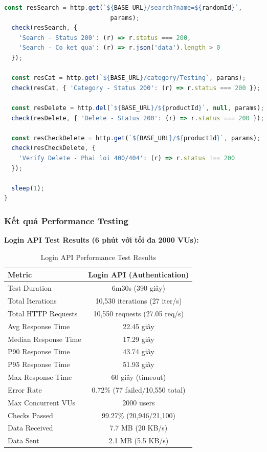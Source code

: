\begin{lstlisting}[language=JavaScript, caption=Performance.productAPI.js - CRUD Operations]
  const resSearch = http.get(`${BASE_URL}/search?name=${randomId}`, 
                             params);
  check(resSearch, { 
    'Search - Status 200': (r) => r.status === 200, 
    'Search - Co ket qua': (r) => r.json('data').length > 0 
  });

  const resCat = http.get(`${BASE_URL}/category/Testing`, params);
  check(resCat, { 'Category - Status 200': (r) => r.status === 200 });

  const resDelete = http.del(`${BASE_URL}/${productId}`, null, params);
  check(resDelete, { 'Delete - Status 200': (r) => r.status === 200 });

  const resCheckDelete = http.get(`${BASE_URL}/${productId}`, params);
  check(resCheckDelete, { 
    'Verify Delete - Phai loi 400/404': (r) => r.status !== 200 
  });

  sleep(1);
}
\end{lstlisting}

\subsubsection{Kết quả Performance Testing}

\textbf{Login API Test Results (6 phút với tối đa 2000 VUs):}
\begin{table}[H]
\centering
\begin{tabular}{|l|c|}
\hline
\textbf{Metric} & \textbf{Login API (Authentication)} \\
\hline
Test Duration & 6m30s (390 giây) \\
\hline
Total Iterations & 10,530 iterations (27 iter/s) \\
\hline
Total HTTP Requests & 10,550 requests (27.05 req/s) \\
\hline
Avg Response Time & 22.45 giây \\
\hline
Median Response Time & 17.29 giây \\
\hline
P90 Response Time & 43.74 giây \\
\hline
P95 Response Time & 51.93 giây \\
\hline
Max Response Time & 60 giây (timeout) \\
\hline
Error Rate & 0.72\% (77 failed/10,550 total) \\
\hline
Max Concurrent VUs & 2000 users \\
\hline
Checks Passed & 99.27\% (20,946/21,100) \\
\hline
Data Received & 7.7 MB (20 KB/s) \\
\hline
Data Sent & 2.1 MB (5.5 KB/s) \\
\hline
\end{tabular}
\caption{Login API Performance Test Results}
\end{table}


